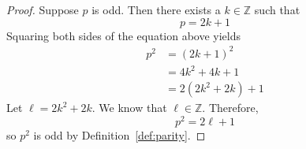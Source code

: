 \documentclass{article}
\newcommand{\Z}{\mathbb{Z}}
\theoremstyle{definition}
\begin{document}
\begin{enumerate}
\begin{proof}
        Suppose $p$ is odd. Then there exists a $k\in \Z$ such that 
        \begin{equation*}
            p = 2k+1
        \end{equation*}
        Squaring both sides of the equation above yields
        \begin{align*}
            p^2 &= (2k+1)^2 \\
            &= 4k^2 + 4k + 1 \\
            &= 2(2k^2 + 2k) + 1
        \end{align*}
        Let $\ell = 2k^2 + 2k$. We know that $\ell\in\Z$. Therefore, 
        \begin{equation*}
            p^2 = 2\ell + 1
        \end{equation*}
        so $p^2$ is odd by Definition~\ref{def:parity}. 
    \end{proof}


\end{enumerate}
\end{document}
